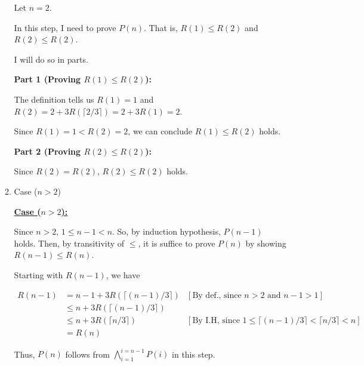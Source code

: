 \documentclass[12pt]{article}
\begin{document}
\begin{enumerate}[a.]
\begin{mdframed}
\begin{enumerate}[1.]
\begin{mdframed}
            \bigskip

            Let $n = 2$.

            \bigskip

            In this step, I need to prove $P(n)$. That is, $R(1) \leq R(2)$ and
            $R(2) \leq R(2)$.

            \bigskip

            I will do so in parts.

            \bigskip

            \textbf{Part 1 (Proving $R(1) \leq R(2)$):}

            \bigskip

            The definition tells us $R(1) = 1$ and $R(2) = 2 +
            3R(\lceil 2/3 \rceil) = 2 + 3R(1) = 2$.

            \bigskip

            Since $R(1) = 1 < R(2) = 2$, we can conclude $R(1) \leq R(2)$ holds.

            \bigskip

            \textbf{Part 2 (Proving $R(2) \leq R(2)$):}

            \bigskip

            Since $R(2) = R(2)$, $R(2) \leq R(2)$ holds.

            \end{mdframed}

            \item Case ($n > 2$)
            \begin{mdframed}
            \underline{\textbf{Case ($n > 2$):}}

            \bigskip

            Since $n > 2$, $1 \leq n-1 < n$. So, by induction hypothesis, $P(n-1)$
            holds. Then, by transitivity of $\leq$, it is suffice to prove $P(n)$
            by showing $R(n-1) \leq R(n)$.

            \bigskip

            Starting with $R(n-1)$, we have

            \begin{align}
            R(n-1) &= n-1 + 3R(\lceil (n-1)/3 \rceil) & [\text{By def., since $n > 2$ and $n - 1 > 1$}]\\
            &\leq n + 3R(\lceil (n-1)/3 \rceil)\\
            &\leq n + 3R(\lceil n/3 \rceil) & [\text{By I.H, since $1 \leq \lceil (n-1)/3 \rceil < \lceil n/3 \rceil < n$}]\\
            &= R(n)
            \end{align}

            \bigskip

            Thus, $P(n)$ follows from $\bigwedge\limits_{i=1}^{i=n-1} P(i)$ in this step.

            \end{mdframed}
        \end{enumerate}
    \end{mdframed}
\end{enumerate}
\end{document}
